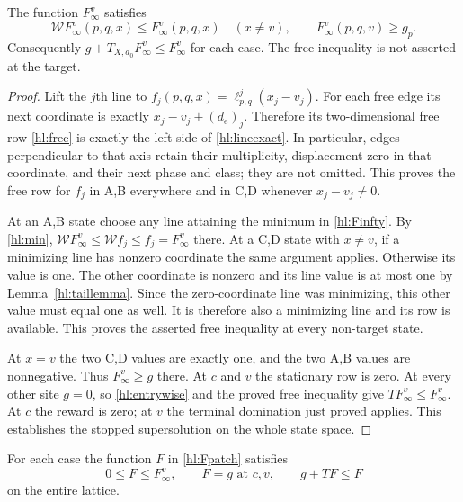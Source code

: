 \begin{lemma}\label{hl:planelemma}
The function $F^v_\infty$ satisfies
\[
 \mathcal WF^v_\infty(p,q,x)\le F^v_\infty(p,q,x)
        \quad(x\ne v),\qquad
 F^v_\infty(p,q,v)\ge g_p.
\]
Consequently $g+T_{X,d_0}F^v_\infty\le F^v_\infty$ for each case.
The free inequality is not asserted at the target.
\end{lemma}

\begin{proof}
Lift the $j$th line to $f_j(p,q,x)=\ell^j_{p,q}(x_j-v_j)$.
For each free edge its next coordinate is exactly
$x_j-v_j+(d_e)_j$.  Therefore its two-dimensional free row
\eqref{hl:free} is exactly the left side of
\eqref{hl:lineexact}.  In particular, edges perpendicular to
that axis retain their multiplicity, displacement zero in that
coordinate, and their next phase and class; they are not omitted.
This proves the free row for $f_j$ in A,B everywhere and in C,D
whenever $x_j-v_j\ne0$.

At an A,B state choose any line attaining the minimum in
\eqref{hl:Finfty}.  By \eqref{hl:min},
$\mathcal WF^v_\infty\le\mathcal Wf_j\le f_j=F^v_\infty$ there.
At a C,D state with $x\ne v$, if a minimizing line has nonzero
coordinate the same argument applies.  Otherwise its value is
one.  The other coordinate is nonzero and its line value is at
most one by Lemma~\ref{hl:taillemma}.  Since the zero-coordinate
line was minimizing, this other value must equal one as well.
It is therefore also a minimizing line and its row is available.
This proves the asserted free inequality at every non-target state.

At $x=v$ the two C,D values are exactly one, and the two A,B
values are nonnegative.  Thus $F^v_\infty\ge g$ there.
At $c$ and $v$ the stationary row is zero.  At every other site
$g=0$, so \eqref{hl:entrywise} and the proved free inequality give
$TF^v_\infty\le F^v_\infty$.  At $c$ the reward is zero; at $v$
the terminal domination just proved applies.  This establishes
the stopped supersolution on the whole state space.
\end{proof}

\begin{lemma}\label{hl:patchlemma}
For each case the function $F$ in \eqref{hl:Fpatch} satisfies
\[
 0\le F\le F^v_\infty,\qquad F=g\text{ at }c,v,
                  \qquad g+TF\le F
\]
on the entire lattice.
\end{lemma}

